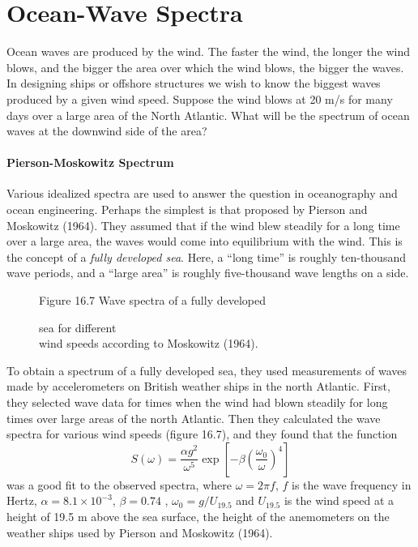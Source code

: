 \section{Ocean-Wave Spectra}
Ocean waves are produced by the wind. The faster the wind, the longer the
wind blows, and the bigger the area over which the wind blows, the bigger the waves. In
designing ships or offshore structures we wish to know the biggest waves produced by a given
wind speed. Suppose the wind blows at 20 m/s for many days over a large area of the North
Atlantic. What will be the spectrum of ocean waves at the downwind side of the area?

\paragraph{Pierson-Moskowitz Spectrum}
Various idealized spectra are used to answer the
question in ocean\-ography and ocean engineering. Perhaps the simplest is that proposed by
Pierson and Moskowitz (1964). They assumed that if the wind blew steadily for a long time over
a large area, the waves would come into equilibrium with the wind. This is the concept of a
\textit{fully developed sea}. Here, a ``long time'' is
roughly ten-thousand wave periods, and a ``large area'' is roughly five-thousand wave lengths
on a side.

\begin{figure}[t!]
\footnotesize
\centering
Figure 16.7 Wave spectra of a fully developed \rule{0mm}{4ex}sea for different\\wind speeds
according to Moskowitz (1964).

\label{fig:PMSpectra}
\vspace{-2ex}
\end{figure}

To obtain a spectrum of a fully developed sea, they used measurements of waves
made by accelerometers on British weather ships in the north Atlantic. First, they
selected wave data for times when the wind had blown steadily for long times over
large areas of the north Atlantic. Then they calculated the wave spectra for various
wind speeds (figure 16.7), and they found that the function
\begin{equation}
S(\omega) = \frac{\alpha g^{2}}{\omega ^{5}} \exp \left[ - \beta \left(
\frac{\omega _{0}}{\omega } \right) ^{4} \right]
\end{equation}
was a good fit to the observed spectra, where $\omega = 2\pi f$, $f$ is the wave frequency in
Hertz,
$\alpha = 8.1
\times 10^{-3}$,
$\beta = 0.74
$ ,
$\omega _{0} = g/U_{19.5}$ and $U_{19.5}$ is the wind speed at a height of 19.5
m above the sea surface, the height of the anemometers on the weather ships
used by Pierson and Moskowitz (1964).

